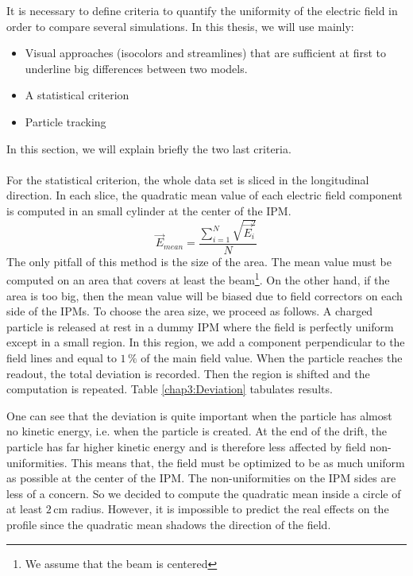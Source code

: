\begin{refsection}
  It is necessary to define criteria to quantify the uniformity of the electric field in order to compare several simulations. In this thesis, we will use mainly:
  \begin{itemize}
    \item Visual approaches (isocolors and streamlines) that are sufficient at first to underline big differences between two models.
    \item A statistical criterion
    \item Particle tracking
  \end{itemize}
  In this section, we will explain briefly the two last criteria.

  \paragraph{}
  For the statistical criterion, the whole data set is sliced in the longitudinal direction. In each slice, the quadratic mean value of each electric field component is computed in an small cylinder at the center of the IPM.
  \begin{equation}
    \vec{E}_{mean} = \frac{\sum_{i=1}^{N}\sqrt{\vec{E}_{i}^{2}}}{N}
  \end{equation}
  The only pitfall of this method is the size of the area. The mean value must be computed on an area that covers at least the beam\footnote{We assume that the beam is centered}. On the other hand, if the area is too big, then the mean value will be biased due to field correctors on each side of the IPMs.
  To choose the area size, we proceed as follows. A charged particle is released at rest in a dummy IPM where the field is perfectly uniform except in a small region. In this region, we add a component perpendicular to the field lines and equal to $1\,\mathrm{\%}$ of the main field value. When the particle reaches the readout, the total deviation is recorded. Then the region is shifted and the computation is repeated. Table \ref{chap3:Deviation} tabulates results.

  

  One can see that the deviation is quite important when the particle has almost no kinetic energy, i.e. when the particle is created.
  At the end of the drift, the particle has far higher kinetic energy and is therefore less affected by field non-uniformities. This means that, the field must be optimized to be as much uniform as possible at the center of the IPM. The non-uniformities on the IPM sides are less of a concern.
  So we decided to compute the quadratic mean inside a circle of at least $2\,\mathrm{cm}$ radius. However, it is impossible to predict the real effects on the profile since the quadratic mean shadows the direction of the field.


\end{refsection}
